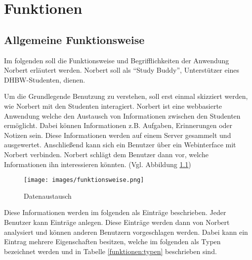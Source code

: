 \chapter{Funktionen}

\section{Allgemeine Funktionsweise}

Im folgenden soll die Funktionsweise und Begrifflichkeiten der Anwendung Norbert erläutert werden.
Norbert soll als \enquote{Study Buddy}, Unterstützer eines DHBW-Studenten, dienen.

Um die Grundlegende Benutzung zu verstehen, soll erst einmal skizziert werden, wie Norbert mit den Studenten interagiert.
Norbert ist eine webbasierte Anwendung welche den Austausch von Informationen zwischen den Studenten ermöglicht.
Dabei können Informationen z.B. Aufgaben, Erinnerungen oder Notizen sein.
Diese Informationen werden auf einem Server gesammelt und ausgewertet.
Anschließend kann sich ein Benutzer über ein Webinterface mit Norbert verbinden.
Norbert schlägt dem Benutzer dann vor, welche Informationen ihn interessieren könnten. (Vgl. Abbildung \ref{funktionen:datenaustausch})

\begin{figure}[H]
    \centering
    \texttt{[image: images/funktionsweise.png]}
    \caption{Datenaustausch}
    \label{funktionen:datenaustausch}
\end{figure}

Diese Informationen werden im folgenden als Einträge beschrieben.
Jeder Benutzer kann Einträge anlegen. Diese Einträge werden dann von Norbert analysiert und können anderen Benutzern vorgeschlagen werden.
Dabei kann ein Eintrag mehrere Eigenschaften besitzen, welche im folgenden als Typen bezeichnet werden und in Tabelle \ref{funktionen:typen} beschrieben sind.

